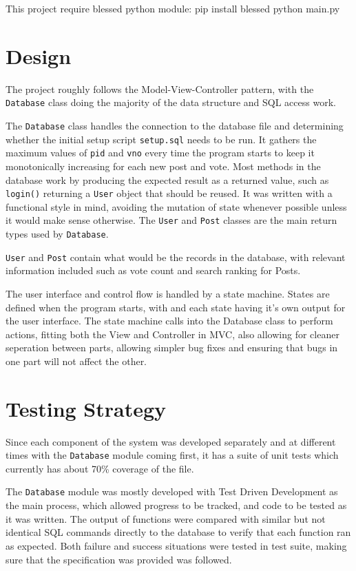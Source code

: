 \documentclass{article}
\begin{document}
This project require blessed python module:
pip install blessed
python main.py

\section{Design}

The project roughly follows the Model-View-Controller pattern, with the \verb|Database| class doing the majority of the data structure and SQL access work. %

The \verb|Database| class handles the connection to the database file and determining whether the initial setup script \verb|setup.sql| needs to be run. It gathers the maximum values of \verb|pid| and \verb|vno| every time the program starts to keep it monotonically increasing for each new post and vote. Most methods in the database work by producing the expected result as a returned value, such as \verb|login()| returning a \verb|User| object that should be reused. It was written with a functional style in mind, avoiding the mutation of state whenever possible unless it would make sense otherwise. The \verb|User| and \verb|Post| classes are the main return types used by \verb|Database|.

\verb|User| and \verb|Post| contain what would be the records in the database, with relevant information included such as vote count and search ranking for Posts.

The user interface and control flow is handled by a state machine. States are defined when the program starts, with and each state having it's own output for the user interface. The state machine calls into the Database class to perform actions, fitting both the View and Controller in MVC, also allowing for cleaner seperation between parts, allowing simpler bug fixes and ensuring that bugs in one part will not affect the other.

\section{Testing Strategy}
Since each component of the system was developed separately and at different times with the \verb|Database| module coming first, it has a suite of unit tests which currently has about 70\% coverage of the file.

The \verb|Database| module was mostly developed with Test Driven Development as the main process, which allowed progress to be tracked, and code to be tested as it was written. The output of functions were compared with similar but not identical SQL commands directly to the database to verify that each function ran as expected. Both failure and success situations were tested in test suite, making sure that the specification was provided was followed.
\end{document}
